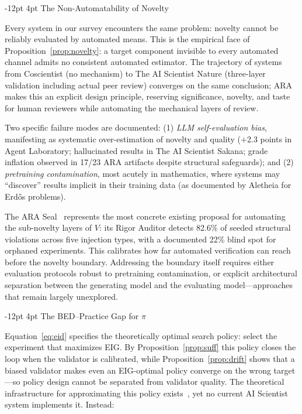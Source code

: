\documentclass[11pt]{article}
\makeatletter
\renewcommand\subsection{\@startsection{subsection}{2}{\z@}%
  {-12pt \@plus -2pt \@minus -2pt}%
  {4pt \@plus 1pt}%
  {\normalfont\normalsize\bfseries}}
\makeatother
\begin{document}
\subsection{The Non-Automatability of Novelty}

Every system in our survey encounters the same problem: novelty cannot be reliably evaluated by automated means. This is the empirical face of Proposition~\ref{prop:novelty}: a target component invisible to every automated channel admits no consistent automated estimator. The trajectory of systems from Coscientist (no mechanism) to The AI Scientist Nature (three-layer validation including actual peer review) converges on the same conclusion; ARA~\citep{liu2026lasthuman} makes this an explicit design principle, reserving significance, novelty, and taste for human reviewers while automating the mechanical layers of review.

Two specific failure modes are documented: (1) \emph{LLM self-evaluation bias}, manifesting as systematic over-estimation of novelty and quality ($+$2.3 points in Agent Laboratory; hallucinated results in The AI Scientist Sakana; grade inflation observed in 17/23 ARA artifacts despite structural safeguards); and (2) \emph{pretraining contamination}, most acutely in mathematics, where systems may ``discover'' results implicit in their training data (as documented by Aletheia for Erd\H{o}s problems).

The ARA Seal~\citep{liu2026lasthuman} represents the most concrete existing proposal for automating the sub-novelty layers of $V$: its Rigor Auditor detects 82.6\% of seeded structural violations across five injection types, with a documented 22\% blind spot for orphaned experiments. This calibrates how far automated verification can reach before the novelty boundary. Addressing the boundary itself requires either evaluation protocols robust to pretraining contamination, or explicit architectural separation between the generating model and the evaluating model---approaches that remain largely unexplored.

\subsection{The BED--Practice Gap for $\pi$}

Equation~\ref{eq:eid} specifies the theoretically optimal search policy: select the experiment that maximizes EIG. By Proposition~\ref{prop:suff} this policy closes the loop when the validator is calibrated, while Proposition~\ref{prop:drift} shows that a biased validator makes even an EIG-optimal policy converge on the wrong target---so policy design cannot be separated from validator quality. The theoretical infrastructure for approximating this policy exists~\citep{foster2019variational,foster2021dad,blau2022rl}, yet no current AI Scientist system implements it. Instead:
\end{document}

